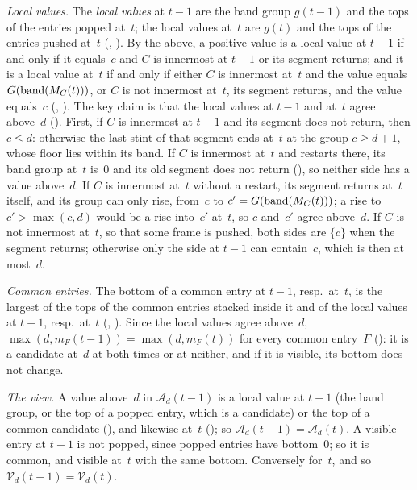 \begin{outline}
\emph{Local values.} The \emph{local values} at $t-1$ are the band group $g(t-1)$ and the tops of the entries popped at~$t$; the
local values at~$t$ are $g(t)$ and the tops of the entries pushed at~$t$ (,
). By the above, a positive value is a local value at $t-1$ if and only if it equals~$c$ and $C$ is
innermost at $t-1$ or its segment returns; and it is a local value at~$t$ if and only if either $C$ is innermost at~$t$ and the value
equals $G(\operatorname{band}(M_C(t)))$, or $C$ is not innermost at~$t$, its segment returns, and the value equals~$c$
(, ). The key claim
is that the local values at $t-1$ and at~$t$ agree above~$d$ (). First, if $C$ is innermost
at $t-1$ and its segment does not return, then $c\le d$: otherwise the last stint of that segment ends at~$t$ at the group $c\ge
d+1$, whose floor lies within its band. If $C$ is innermost at~$t$ and restarts there, its band group at~$t$ is~$0$ and its old
segment does not return (), so neither side has a value above~$d$. If $C$ is innermost
at~$t$ without a restart, its segment returns at~$t$ itself, and its group can only rise, from~$c$ to $c'=G(\operatorname{band}(M_C(t)))$; a rise
to $c'>\max(c,d)$ would be a rise into~$c'$ at~$t$, so $c$ and~$c'$ agree above~$d$. If $C$ is not innermost at~$t$, so that some
frame is pushed, both sides are $\{c\}$ when the segment returns; otherwise only the side at $t-1$ can contain~$c$, which is then at
most~$d$.

\emph{Common entries.} The bottom of a common entry at $t-1$, resp.\ at~$t$, is the largest of the tops of the common entries
stacked inside it and of the local values at $t-1$, resp.\ at~$t$ (,
). Since the local values agree above~$d$, $\max(d,m_F(t-1))=\max(d,m_F(t))$ for every
common entry~$F$ (): it is a candidate at~$d$ at both times or at neither, and if it is visible,
its bottom does not change.

\emph{The view.} A value above~$d$ in $\mathcal A_d(t-1)$ is a local value at $t-1$ (the band group, or the top of a popped entry,
which is a candidate) or the top of a common candidate (), and likewise at~$t$
(); so $\mathcal A_d(t-1)=\mathcal A_d(t)$. A visible entry at $t-1$ is not popped, since popped
entries have bottom~$0$; so it is common, and visible at~$t$ with the same bottom. Conversely for~$t$, and so
$\mathcal V_d(t-1)=\mathcal V_d(t)$.
\end{outline}

